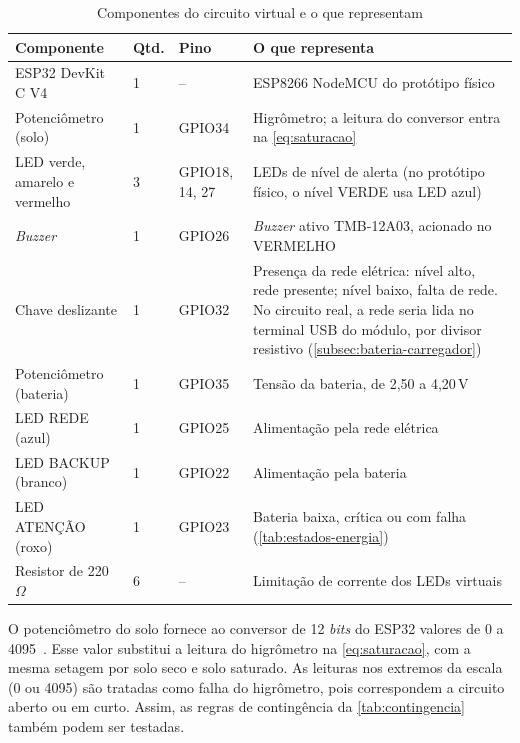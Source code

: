 \begin{table}[H]
\centering
\caption{Componentes do circuito virtual e o que representam}
\label{tab:componentes-wokwi}
\small
\begin{tabular}{p{4.2cm}p{0.8cm}p{1.3cm}p{8.0cm}}
\hline
\textbf{Componente} & \textbf{Qtd.} & \textbf{Pino} & \textbf{O que representa} \\
\hline
ESP32 DevKit C V4 & 1 & -- & ESP8266 NodeMCU do protótipo físico \\
Potenciômetro (solo) & 1 & GPIO34 & Higrômetro; a leitura do conversor entra na \autoref{eq:saturacao} \\
LED verde, amarelo e vermelho & 3 & GPIO18, 14, 27 & LEDs de nível de alerta (no protótipo físico, o nível VERDE usa LED azul) \\
\textit{Buzzer} & 1 & GPIO26 & \textit{Buzzer} ativo TMB-12A03, acionado no VERMELHO \\
Chave deslizante & 1 & GPIO32 & Presença da rede elétrica: nível alto, rede presente; nível baixo, falta de rede. No circuito real, a rede seria lida no terminal USB do módulo, por divisor resistivo (\autoref{subsec:bateria-carregador}) \\
Potenciômetro (bateria) & 1 & GPIO35 & Tensão da bateria, de 2,50 a 4,20\,V \\
LED REDE (azul) & 1 & GPIO25 & Alimentação pela rede elétrica \\
LED BACKUP (branco) & 1 & GPIO22 & Alimentação pela bateria \\
LED ATENÇÃO (roxo) & 1 & GPIO23 & Bateria baixa, crítica ou com falha (\autoref{tab:estados-energia}) \\
Resistor de 220\,$\Omega$ & 6 & -- & Limitação de corrente dos LEDs virtuais \\
\hline
\end{tabular}
\end{table}

O potenciômetro do solo fornece ao conversor de 12 \textit{bits} do ESP32
valores de 0 a 4095~\cite{espressif_esp32}. Esse valor substitui a leitura
do higrômetro na \autoref{eq:saturacao}, com a mesma setagem por solo
seco e solo saturado.
As leituras nos extremos da escala (0 ou 4095) são tratadas como falha do
higrômetro, pois correspondem a circuito aberto ou em curto. Assim, as
regras de contingência da \autoref{tab:contingencia} também podem ser
testadas.

